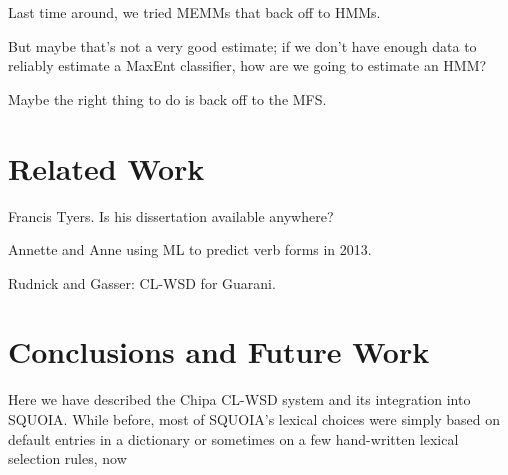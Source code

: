 \documentclass[10pt, a4paper]{article}
\begin{document}
Last time around, we tried MEMMs that back off to HMMs.


But maybe that's not a very good estimate; if we don't have enough data to
reliably estimate a MaxEnt classifier, how are we going to estimate an HMM?


Maybe the right thing to do is back off to the MFS.




\section{Related Work}
Francis Tyers. Is his dissertation available anywhere?
\cite{tyers-dissertation}


Annette and Anne
using ML to predict verb forms in 2013.
\cite{riosgonzales-gohring:2013:HyTra}


Rudnick and Gasser: CL-WSD for Guarani.


\section{Conclusions and Future Work}
Here we have described the Chipa CL-WSD system and its integration into SQUOIA.
While before, most of SQUOIA's lexical choices were simply based on default
entries in a dictionary or sometimes on a few hand-written lexical selection
rules, now 




\end{document}
